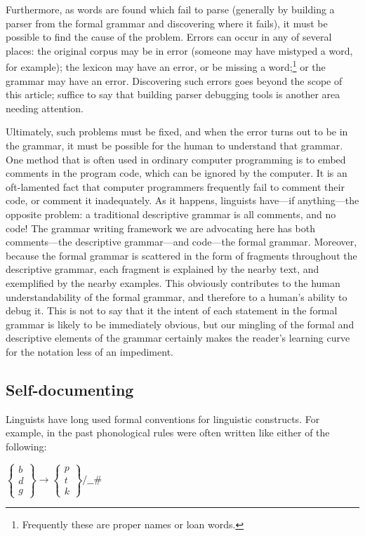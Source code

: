 Furthermore, as words are found which fail to parse (generally by building a parser from the formal grammar and discovering where it fails), it must be possible to find the cause of the problem. Errors can occur in any of several places: the original corpus may be in error (someone may have mistyped a word, for example); the lexicon may have an error, or be missing a word;\footnote{Frequently
  these are proper names or loan words.
}
or the grammar may have an error. Discovering such errors goes beyond the scope of this article; suffice to say that building parser debugging tools is another area needing attention.

Ultimately, such problems must be fixed, and when the error turns out to be in the grammar, it must be possible for the human to understand that grammar. One method that is often used in ordinary computer programming is to embed comments in the program code, which can be ignored by the computer. It is an oft-lamented fact that computer programmers frequently fail to comment their code, or comment it inadequately. As it happens, linguists have---if anything---the opposite problem: a traditional descriptive grammar is all comments, and no code! The grammar writing framework we are advocating here has both comments---the descriptive grammar---and code---the formal grammar. Moreover, because the formal grammar is scattered in the form of fragments throughout the descriptive grammar, each fragment is explained by the nearby text, and exemplified by the nearby examples. This obviously contributes to the human understandability of the formal grammar, and therefore to a human's ability to debug it. This is not to say that it the intent of each statement in the formal grammar is likely to be immediately obvious, but our mingling of the formal and descriptive elements of the grammar certainly makes the reader's learning curve for the notation less of an impediment.

\subsection{Self-documenting}
Linguists have long used formal conventions for linguistic constructs. For example, in the past phonological rules were often written like either of the following:

\ea  $\left\{
       \begin{array}{l}
             b\\
             d\\
             g
        \end{array}
        \right\}
   \rightarrow 
       \left\{
       \begin{array}{l}
           p\\
           t\\
           k
        \end{array}
        \right\}
    {\mathrm{/}}\mathrm{\_\_\#}$
\z

